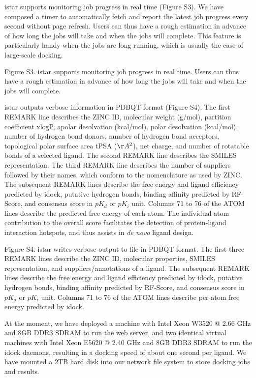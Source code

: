 istar supports monitoring job progress in real time (Figure S3). We have composed a timer to automatically fetch and report the latest job progress every second without page refresh. Users can thus have a rough estimation in advance of how long the jobs will take and when the jobs will complete. This feature is particularly handy when the jobs are long running, which is usually the case of large-scale docking.

Figure S3. istar supports monitoring job progress in real time. Users can thus have a rough estimation in advance of how long the jobs will take and when the jobs will complete.

istar outputs verbose information in PDBQT format (Figure S4). The first REMARK line describes the ZINC ID, molecular weight (g/mol), partition coefficient xlogP, apolar desolvation (kcal/mol), polar desolvation (kcal/mol), number of hydrogen bond donors, number of hydrogen bond acceptors, topological polar surface area tPSA ($\AA^2$), net charge, and number of rotatable bonds of a selected ligand. The second REMARK line describes the SMILES representation. The third REMARK line describes the number of suppliers followed by their names, which conform to the nomenclature as used by ZINC. The subsequent REMARK lines describe the free energy and ligand efficiency predicted by idock, putative hydrogen bonds, binding affinity predicted by RF-Score, and consensus score in $pK_d$ or $pK_i$ unit. Columns 71 to 76 of the ATOM lines describe the predicted free energy of each atom. The individual atom contribution to the overall score facilitates the detection of protein-ligand interaction hotspots, and thus assists in \textit{de novo} ligand design.

Figure S4. istar writes verbose output to file in PDBQT format. The first three REMARK lines describe the ZINC ID, molecular properties, SMILES representation, and suppliers/annotations of a ligand. The subsequent REMARK lines describe the free energy and ligand efficiency predicted by idock, putative hydrogen bonds, binding affinity predicted by RF-Score, and consensus score in $pK_d$ or $pK_i$ unit. Columns 71 to 76 of the ATOM lines describe per-atom free energy predicted by idock.

At the moment, we have deployed a machine with Intel Xeon W3520 @ 2.66 GHz and 8GB DDR3 SDRAM to run the web server, and two identical virtual machines with Intel Xeon E5620 @ 2.40 GHz and 8GB DDR3 SDRAM to run the idock daemons, resulting in a docking speed of about one second per ligand. We have mounted a 2TB hard disk into our network file system to store docking jobs and results.

